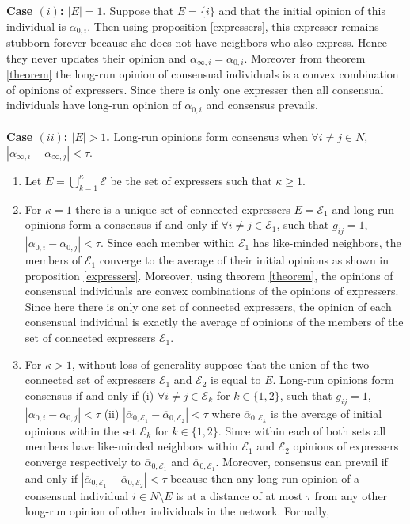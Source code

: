 \documentclass{article}
\begin{document}
{\bf Case $(i)$: $|E|=1$.} Suppose that $E=\{ i \}$ and that the initial opinion of this individual is $\alpha_{0,i}$. Then using proposition \ref{expressers}, this expresser remains stubborn forever because she does not have neighbors who also express. Hence they never updates their opinion and $\alpha_{\infty,i} = \alpha_{0,i}$. Moreover from theorem \ref{theorem} the long-run opinion of consensual individuals is a convex combination of opinions of expressers. Since there is only one expresser then all consensual individuals have long-run opinion of  $\alpha_{0,i}$ and consensus prevails. \\
\\ {\bf Case $(ii)$: $|E|>1$.} Long-run opinions form consensus when $\forall i \neq j \in N$, $|\alpha_{\infty,i} - \alpha_{\infty,j}|<\tau$.

\begin{enumerate}
\item Let $E = \bigcup_{k=1}^{\kappa} \mathcal{E}$ be the set of expressers such that $\kappa \geq 1$. 
\item For $\kappa =1$ there is a unique set of connected expressers $E=\mathcal{E}_1$ and long-run opinions form a consensus if and only if $\forall i \neq j \in \mathcal{E}_1$, such that $g_{ij}=1$, $|\alpha_{0,i} - \alpha_{0,j}|<\tau$. Since each member within $\mathcal{E}_1$ has like-minded neighbors, the members of $\mathcal{E}_1$ converge to the average of their initial opinions as shown in proposition \ref{expressers}. Moreover, using theorem \ref{theorem}, the opinions of consensual individuals are convex combinations of the opinions of expressers. Since here there is only one set of connected expressers, the opinion of each consensual individual is exactly the average of opinions of the members of the set of connected expressers $\mathcal{E}_1$.
\item For $\kappa >1$, without loss of generality suppose that the union of the two connected set of expressers $\mathcal{E}_1$ and $\mathcal{E}_2$ is equal to $E$. Long-run opinions form consensus if and only if (i) $\forall i \neq j \in \mathcal{E}_k$ for $k \in \{ 1,2\}$, such that $g_{ij}=1$, $|\alpha_{0,i} - \alpha_{0,j}|<\tau$ (ii) $|\overline{\alpha}_{0,{\mathcal{E}_1}} - \overline{\alpha}_{0,{\mathcal{E}_2}} |<\tau$ where $\overline{\alpha}_{0,{\mathcal{E}_k}}$ is the average of initial opinions within the set $\mathcal{E}_k$ for $k \in \{ 1,2\}$. Since within each of both sets all members have like-minded neighbors within $\mathcal{E}_1$ and $\mathcal{E}_2$  opinions of expressers converge respectively to $\overline{\alpha}_{0,{\mathcal{E}_1}}$ and $\overline{\alpha}_{0,{\mathcal{E}_1}}$. Moreover, consensus can prevail if and only if $|\overline{\alpha}_{0,{\mathcal{E}_1}} - \overline{\alpha}_{0,{\mathcal{E}_2}} |<\tau$ because then any long-run opinion of a consensual individual $i \in N \setminus E$ is at a distance of at most $\tau$ from any other long-run opinion of other individuals in the network. Formally, 

\end{enumerate}
\end{document}
